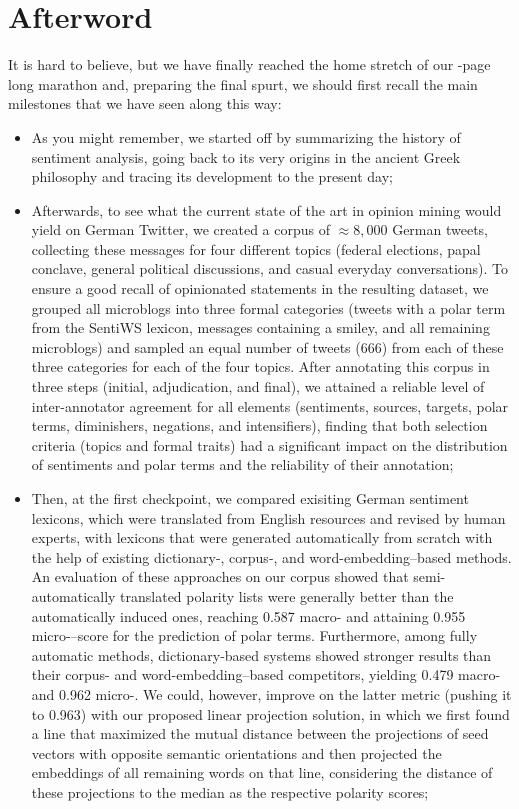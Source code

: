 \chapter*{Afterword}

It is hard to believe, but we have finally reached the home stretch of
our \thepage-page long marathon and, preparing the final spurt, we
should first recall the main milestones that we have seen along this
way:
\begin{itemize}
\item As you might remember, we started off by summarizing the history
  of sentiment analysis, going back to its very origins in the ancient
  Greek philosophy and tracing its development to the present day;

\item Afterwards, to see what the current state of the art in opinion
  mining would yield on German Twitter, we created a corpus of
  $\approx8,000$ German tweets, collecting these messages for four
  different topics (federal elections, papal conclave, general
  political discussions, and casual everyday conversations).  To
  ensure a good recall of opinionated statements in the resulting
  dataset, we grouped all microblogs into three formal categories
  (tweets with a polar term from the SentiWS lexicon, messages
  containing a smiley, and all remaining microblogs) and sampled an
  equal number of tweets (666) from each of these three categories for
  each of the four topics.  After annotating this corpus in three
  steps (initial, adjudication, and final), we attained a reliable
  level of inter-annotator agreement for all elements (sentiments,
  sources, targets, polar terms, diminishers, negations, and
  intensifiers), finding that both selection criteria (topics and
  formal traits) had a significant impact on the distribution of
  sentiments and polar terms and the reliability of their annotation;

\item Then, at the first checkpoint, we compared exisiting German
  sentiment lexicons, which were translated from English resources and
  revised by human experts, with lexicons that were generated
  automatically from scratch with the help of existing
  dictionary\mbox{-,} corpus\mbox{-,} and word-embedding--based
  methods.  An evaluation of these approaches on our corpus showed
  that semi-automatically translated polarity lists were generally
  better than the automatically induced ones, reaching 0.587
  macro-\F{} and attaining 0.955 micro-\F{}--score for the prediction
  of polar terms.  Furthermore, among fully automatic methods,
  dictionary-based systems showed stronger results than their corpus-
  and word-embedding--based competitors, yielding 0.479 macro-\F{} and
  0.962 micro-\F{}.  We could, however, improve on the latter metric
  (pushing it to 0.963) with our proposed linear projection solution,
  in which we first found a line that maximized the mutual distance
  between the projections of seed vectors with opposite semantic
  orientations and then projected the embeddings of all remaining
  words on that line, considering the distance of these projections to
  the median as the respective polarity scores;


\end{itemize}
